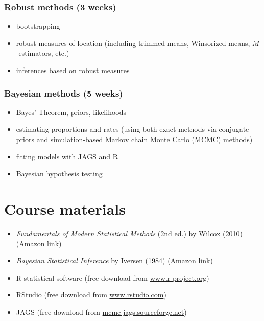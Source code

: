 \documentclass[10pt]{article}
\begin{document}
\subsubsection*{Robust methods (3 weeks)}
\label{sec-2-0-2}
\begin{itemize}
\item bootstrapping
\item robust measures of location (including trimmed means, Winsorized means, $M$-estimators, etc.)
\item inferences based on robust measures
\end{itemize}

\subsubsection*{Bayesian methods (5 weeks)}
\label{sec-2-0-3}
\begin{itemize}
\item Bayes' Theorem, priors, likelihoods
\item estimating proportions and rates (using both exact methods via conjugate priors and simulation-based Markov chain Monte Carlo (MCMC) methods)
\item fitting models with JAGS and R
\item Bayesian hypothesis testing
\end{itemize}

\section*{Course materials}
\label{sec-3}

\begin{itemize}
\item \emph{Fundamentals of Modern Statistical Methods} (2nd ed.) by Wilcox (2010) (\href{https://www.amazon.com/Fundamentals-Modern-Statistical-Methods-Substantially/dp/1441955240/}{Amazon link)}
\item \emph{Bayesian Statistical Inference} by Iversen (1984) (\href{https://www.amazon.com/Bayesian-Statistical-Inference-Quantitative-Applications/dp/0803923287/}{Amazon link)}
\item R statistical software (free download from \href{http://www.r-project.org}{www.r-project.org})
\item RStudio (free download from \href{http://www.rstudio.com}{www.rstudio.com})
\item JAGS (free download from \href{http://mcmc-jags.sourceforge.net}{mcmc-jags.sourceforge.net})
\end{itemize}
\end{document}
